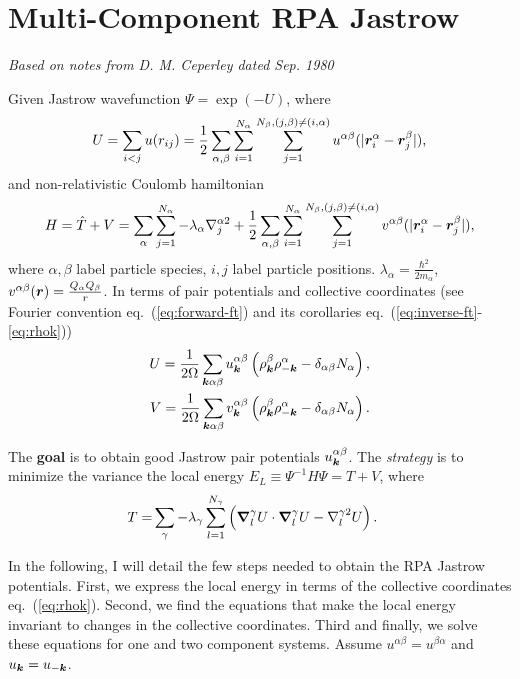 \section{Multi-Component RPA Jastrow}
\label{sec:mc-rpa-jas}

\textit{Based on notes from D. M. Ceperley dated Sep. 1980}

Given Jastrow wavefunction $\Psi=\exp(-U)$, where
\begin{align}
U = \sum\limits_{i<j} u(r_{ij}) = \frac{1}{2} \sum\limits_{\alpha, \beta} \sum\limits_{i=1}^{N_\alpha} \sum\limits_{j=1}^{N_\beta, (j,\beta)\neq(i,\alpha)}
u^{\alpha\beta}(\vert\boldsymbol{r}_i^\alpha-\boldsymbol{r}_j^\beta\vert), \label{eq:Uurij}
\end{align}
and non-relativistic Coulomb hamiltonian
\begin{align}
H = \hat{T}+V = \sum\limits_{\alpha}\sum\limits_{j=1}^{N_\alpha} -\lambda_{\alpha}\nabla^{\alpha2}_j + \frac{1}{2}\sum\limits_{\alpha, \beta} \sum\limits_{i=1}^{N_\alpha} \sum\limits_{j=1}^{N_\beta, (j,\beta)\neq(i,\alpha)} v^{\alpha\beta}(\vert\boldsymbol{r}_i^\alpha - \boldsymbol{r}_j^\beta \vert),
\end{align}
where $\alpha, \beta$ label particle species, $i, j$ label particle positions. $\lambda_\alpha=\frac{\hbar^2}{2m_\alpha}$, $v^{\alpha\beta}(\boldsymbol{r})=\frac{Q_\alpha Q_\beta}{r}$. In terms of pair potentials and collective coordinates (see Fourier convention eq.~(\ref{eq:forward-ft}) and its corollaries eq.~(\ref{eq:inverse-ft}-\ref{eq:rhok}))
\begin{align}
U = \frac{1}{2\Omega} \sum\limits_{\boldsymbol{k}\alpha\beta}
u^{\alpha\beta}_{\boldsymbol{k}} \left( \rho^\beta_{\boldsymbol{k}}\rho^\alpha_{-\boldsymbol{k}}-\delta_{\alpha\beta}N_\alpha
\right), \label{eq:Uuk} \\
V = \frac{1}{2\Omega} \sum\limits_{\boldsymbol{k}\alpha\beta}
v^{\alpha\beta}_{\boldsymbol{k}} \left( \rho^\beta_{\boldsymbol{k}}\rho^\alpha_{-\boldsymbol{k}}-\delta_{\alpha\beta}N_\alpha \right).
\end{align}

The \textbf{goal} is to obtain good Jastrow pair potentials $u_{\boldsymbol{k}}^{\alpha\beta}$. The \textit{strategy} is to minimize the variance the local energy $E_L\equiv \Psi^{-1}H\Psi = T + V$, where
\begin{align}
T =& \sum\limits_{\gamma}-\lambda_{\gamma}
\sum\limits_{l=1}^{N_\gamma}  \left(\boldsymbol{\nabla}_l^{\gamma}U\cdot\boldsymbol{\nabla}_l^{\gamma}U - \nabla^{\gamma2}_l U \right).
\end{align}

In the following, I will detail the few steps needed to obtain the RPA Jastrow potentials. First, we express the local energy in terms of the collective coordinates eq.~(\ref{eq:rhok}). Second, we find the equations that make the local energy invariant to changes in the collective coordinates. Third and finally, we solve these equations for one and two component systems. Assume $u^{\alpha\beta}=u^{\beta\alpha}$ and $u_{\boldsymbol{k}}=u_{-\boldsymbol{k}}$.

